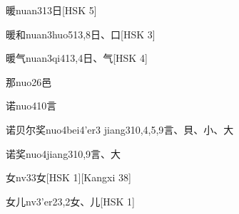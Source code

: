\begin{EntryWithPhonetic}{暖}{nuan3}{13}{⽇}[HSK 5]
\end{EntryWithPhonetic}

\begin{EntryWithPhonetic}{暖和}{nuan3huo5}{13,8}{⽇、⼝}[HSK 3]
\end{EntryWithPhonetic}

\begin{EntryWithPhonetic}{暖气}{nuan3qi4}{13,4}{⽇、⽓}[HSK 4]
\end{EntryWithPhonetic}

\begin{EntryWithPhonetic}{那}{nuo2}{6}{⾢}
\end{EntryWithPhonetic}

\begin{EntryWithPhonetic}{诺}{nuo4}{10}{⾔}
\end{EntryWithPhonetic}

\begin{EntryWithPhonetic}{诺贝尔奖}{nuo4bei4'er3 jiang3}{10,4,5,9}{⾔、⾙、⼩、⼤}
\end{EntryWithPhonetic}

\begin{EntryWithPhonetic}{诺奖}{nuo4jiang3}{10,9}{⾔、⼤}
\end{EntryWithPhonetic}

\begin{EntryWithPhonetic}{女}{nv3}{3}{⼥}[HSK 1][Kangxi 38]
\end{EntryWithPhonetic}

\begin{EntryWithPhonetic}{女儿}{nv3'er2}{3,2}{⼥、⼉}[HSK 1]
\end{EntryWithPhonetic}

